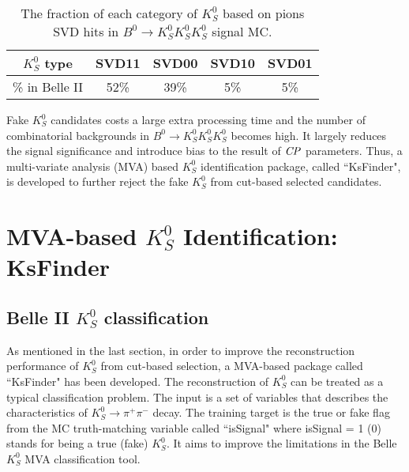 \begin{table}[H]
	\centering
	\begin{tabular}{|c|c|c|c|c|}
		\hline
		$K_S^0$ type & SVD11 & SVD00 & SVD10 & SVD01\\
		\hline
		\% in Belle II & 52\% & 39\% & 5\% & 5\%\\
		\hline
	\end{tabular}
	\caption{The fraction of each category of $K_S^0$ based on pions SVD hits in $B^0 \to K_S^0  K_S^0  K_S^0$ signal MC.}
	\label{tab:svdxx}
\end{table}
\begin{comment}
\begin{figure}[htpb]
\centering
\texttt{[image: VXDGEO.png]}
\caption{Geometric structure of PXD and SVD in Belle II\cite{Abe:2010gxa}. SVD Layer 5 is at $r = 11$ cm and $K_S^0$ that decay outside are very likely to lose SVD hits information.}
\label{fig:vxdgeo}
\end{figure}
\end{comment}


Fake $K_S^0$ candidates costs a large extra processing time and the number of combinatorial backgrounds in $B^0 \to K_S^0  K_S^0  K_S^0$ becomes high. It largely reduces the signal significance and introduce bias to the result of $\it{CP}$ parameters. Thus, a multi-variate analysis (MVA) based $K_S^0$ identification package, called ``KsFinder", is developed to further reject the fake $K_S^0$ from cut-based selected candidates.


\section{MVA-based $K_S^0$ Identification: KsFinder}

\subsection{Belle II $K_S^0$ classification}
As mentioned in the last section, in order to improve the reconstruction performance of $K_S^0$ from cut-based selection, a MVA-based package called ``KsFinder" has been developed. The reconstruction of $K_S^0$ can be treated as a typical classification problem. The input is a set of variables that describes the characteristics of $K_S^0 \to \pi^+ \pi^-$ decay. The training  target is the true or fake flag from the MC truth-matching variable called ``isSignal" where isSignal = 1 (0) stands for being a true (fake) $K_S^0$. It aims to improve the limitations in the Belle $K_S^0$ MVA classification tool. 
 
